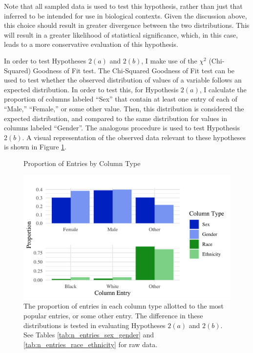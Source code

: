 Note that all sampled data is used to test this hypothesis, rather than just that inferred to be intended for use in biological contexts. Given the discussion above, this choice should result in greater divergence between the two distributions. This will result in a greater likelihood of statistical significance, which, in this case, leads to a more conservative evaluation of this hypothesis.

In order to test Hypotheses $2(a)$ and $2(b)$, I make use of the $\chi^2$ (Chi-Squared) Goodness of Fit test. The Chi-Squared Goodness of Fit test can be used to test whether the observed distribution of values of a variable follows an expected distribution. In order to test this, for Hypothesis $2(a)$, I calculate the proportion of columns labeled ``Sex'' that contain at least one entry of each of ``Male,'' ``Female,'' or some other value. Then, this distribution is considered the expected distribution, and compared to the same distribution for values in columns labeled ``Gender''. The analogous procedure is used to test Hypothesis $2(b)$. A visual representation of the observed data relevant to these hypotheses is shown in Figure \ref{fig:common_entries}.

\begin{figure} [!htb]
    \caption{Proportion of Entries by Column Type}
    \centering
    \includegraphics[width=.8\linewidth]{figures/common_entries.png}
    \captionsetup{width=0.8\textwidth}
    \caption*{The proportion of entries in each column type allotted to the most popular entries, or some other entry. The difference in these distributions is tested in evaluating Hypotheses $2(a)$ and $2(b)$. See Tables \ref{tab:n_entries_sex_gender} and \ref{tab:n_entries_race_ethnicity} for raw data.}
    \label{fig:common_entries}
\end{figure}





